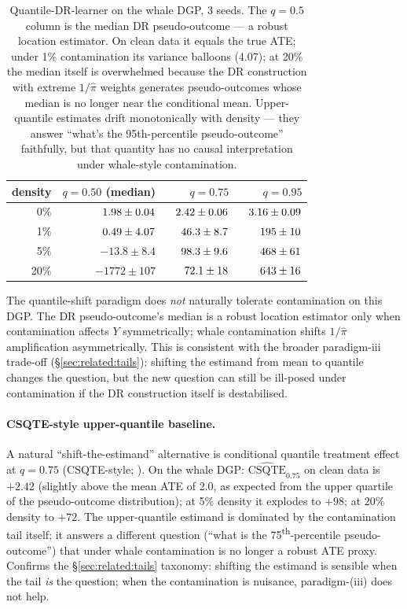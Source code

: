 \begin{table}[!t]
\centering
\small
\begin{tabular}{rrrr}
\toprule
density & $q = 0.50$ (median) & $q = 0.75$ & $q = 0.95$ \\
\midrule
0\%   & $\hphantom{-}1.98 \pm 0.04$ & $\hphantom{-}2.42 \pm 0.06$ & $\hphantom{-}3.16 \pm 0.09$ \\
1\%   & $\hphantom{-}0.49 \pm 4.07$ & $\hphantom{-}46.3 \pm 8.7$  & $\hphantom{-}195 \pm 10$ \\
5\%   & $-13.8 \pm 8.4$             & $\hphantom{-}98.3 \pm 9.6$  & $\hphantom{-}468 \pm 61$ \\
20\%  & $-1772 \pm 107$             & $\hphantom{-}72.1 \pm 18$   & $\hphantom{-}643 \pm 16$ \\
\bottomrule
\end{tabular}
\caption{Quantile-DR-learner on the whale DGP, 3 seeds. The
$q = 0.5$ column is the median DR pseudo-outcome --- a robust
location estimator. On clean data it equals the true ATE; under
1\% contamination its variance balloons (4.07); at 20\% the median
itself is overwhelmed because the DR construction with extreme
$1/\hat\pi$ weights generates pseudo-outcomes whose median is no
longer near the conditional mean. Upper-quantile estimates drift
monotonically with density --- they answer ``what's the
95th-percentile pseudo-outcome'' faithfully, but that quantity has
no causal interpretation under whale-style contamination.}
\label{tab:quantile_dr}
\end{table}

The quantile-shift paradigm does \emph{not} naturally tolerate
contamination on this DGP. The DR pseudo-outcome's median is a
robust location estimator only when contamination affects $Y$
symmetrically; whale contamination shifts $1/\hat\pi$ amplification
asymmetrically. This is consistent with the broader paradigm-iii
trade-off (\S\ref{sec:related:tails}): shifting the estimand from
mean to quantile changes the question, but the new question can
still be ill-posed under contamination if the DR construction itself
is destabilised.

\paragraph{CSQTE-style upper-quantile baseline.}
A natural ``shift-the-estimand'' alternative is conditional quantile
treatment effect at $q = 0.75$ (CSQTE-style;
\citealp{kallus2018policy}). On the whale DGP:
$\hat{\mathrm{CSQTE}}_{0.75}$ on clean data is $+2.42$ (slightly above
the mean ATE of 2.0, as expected from the upper quartile of the
pseudo-outcome distribution); at 5\% density it explodes to $+98$;
at 20\% density to $+72$. The upper-quantile estimand is dominated
by the contamination tail itself; it answers a different question
(``what is the 75\textsuperscript{th}-percentile pseudo-outcome'')
that under whale contamination is no longer a robust ATE proxy.
Confirms the \S\ref{sec:related:tails} taxonomy: shifting the
estimand is sensible when the tail \emph{is} the question; when the
contamination is nuisance, paradigm-(iii) does not help.

